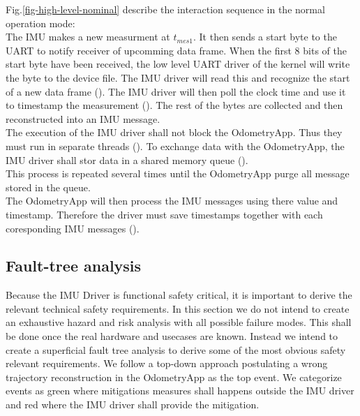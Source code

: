 Fig.\ref{fig-high-level-nominal} describe the interaction sequence in the normal operation mode:\\
The IMU makes a new measurment at $t_{mes1}$.
It then sends a start byte to the UART to notify receiver of upcomming data frame.
When the first 8 bits of the start byte have been received, the low level UART driver of the kernel will write the byte to the device file.
The IMU driver will read this and recognize the start of a new data frame ().
The IMU driver will then poll the clock time and use it to timestamp the measurement ().
The rest of the bytes are collected and then reconstructed into an IMU message.\\
The execution of the IMU driver shall not block the OdometryApp. Thus they must run in separate threads ().
To exchange data with the OdometryApp, the IMU driver shall stor data in a shared memory queue ().\\
This process is repeated several times until the OdometryApp purge all message stored in the queue.\\
The OdometryApp will then process the IMU messages using there value and timestamp.
Therefore the driver must save timestamps together with each coresponding IMU messages ().

\subsection{Fault-tree analysis}
Because the IMU Driver is functional safety critical, it is important to derive the relevant technical safety requirements.
In this section we do not intend to create an exhaustive hazard and risk analysis with all possible failure modes.
This shall be done once the real hardware and usecases are known.
Instead we intend to create a superficial fault tree analysis to derive some of the most obvious safety relevant requirements.
We follow a top-down approach postulating a wrong trajectory reconstruction in the OdometryApp as the top event.
We categorize events as green where mitigations measures shall happens outside the IMU driver and red where the IMU driver shall provide the mitigation.

